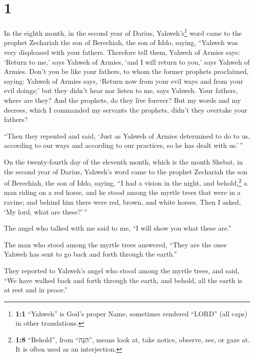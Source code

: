 \hypertarget{section}{%
\section{1}\label{section}}

 In the eighth month, in the second year of Darius,
Yahweh's\footnote{\textbf{1:1} ``Yahweh'' is God's proper Name,
  sometimes rendered ``LORD'' (all caps) in other translations.} word
came to the prophet Zechariah the son of Berechiah, the son of Iddo,
saying,  ``Yahweh was very displeased with your fathers.
 Therefore tell them, Yahweh of Armies says: `Return to
me,' says Yahweh of Armies, `and I will return to you,' says Yahweh of
Armies.  Don't you be like your fathers, to whom the
former prophets proclaimed, saying: Yahweh of Armies says, `Return now
from your evil ways and from your evil doings;' but they didn't hear nor
listen to me, says Yahweh.  Your fathers, where are they?
And the prophets, do they live forever?  But my words and
my decrees, which I commanded my servants the prophets, didn't they
overtake your fathers?

``Then they repented and said, `Just as Yahweh of Armies determined to
do to us, according to our ways and according to our practices, so he
has dealt with us.'\,''

 On the twenty-fourth day of the eleventh month, which is
the month Shebat, in the second year of Darius, Yahweh's word came to
the prophet Zechariah the son of Berechiah, the son of Iddo, saying,
 ``I had a vision in the night, and behold,\footnote{\textbf{1:8}
  ``Behold'', from ``הִנֵּה'', means look at, take notice, observe, see,
  or gaze at. It is often used as an interjection.} a man riding on a
red horse, and he stood among the myrtle trees that were in a ravine;
and behind him there were red, brown, and white horses. 
Then I asked, `My lord, what are these?'\,''

The angel who talked with me said to me, ``I will show you what these
are.''

 The man who stood among the myrtle trees answered,
``They are the ones Yahweh has sent to go back and forth through the
earth.''

 They reported to Yahweh's angel who stood among the
myrtle trees, and said, ``We have walked back and forth through the
earth, and behold, all the earth is at rest and in peace.''

